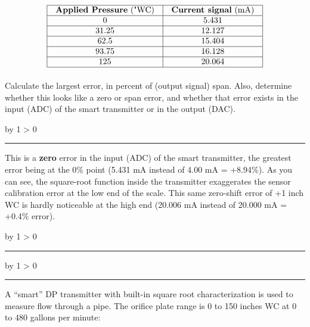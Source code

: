 \documentclass[12pt,a4paper]{article}
\def\oppgave{
            \advance\questnum by 1
            \ifnum \questnum > 0
                 \hrule
                 \vskip 3pt
                 \leftline{Oppgave \the\questnum}
                 \vskip 3pt \fi}
\def\svar{
           \advance\answnum by 1
           \ifnum \answnum > 0
                \hrule
                \vskip 3pt
                \leftline{Svar \the\answnum}
                \vskip 3pt \fi}
\def\notes{
           \advance\explnum by 1
           \ifnum \explnum > 0
                \hrule
                \vskip 3pt
                \leftline{Notes \the\explnum}
                \vskip 3pt \fi}
\begin{document}

$$\vbox{\offinterlineskip
\halign{\strut
\vrule \quad\hfil # \ \hfil & 
\vrule \quad\hfil # \ \hfil \vrule \cr
\noalign{\hrule}
%
{\bf Applied Pressure} ("WC) & {\bf Current signal} (mA) \cr
%
\noalign{\hrule}
%
0 & 5.431 \cr
%
\noalign{\hrule}
%
31.25 & 12.127 \cr
%
\noalign{\hrule}
%
62.5 & 15.404 \cr
%
\noalign{\hrule}
%
93.75 & 16.128 \cr
%
\noalign{\hrule}
%
125 & 20.064 \cr
%
\noalign{\hrule}
} %
}$$ %

Calculate the largest error, in percent of (output signal) span.  Also, determine whether this looks like a zero or span error, and whether that error exists in the input (ADC) of the smart transmitter or in the output (DAC).

\vskip 10pt \filbreak 





\svar{} 

This is a {\bf zero} error in the input (ADC) of the smart transmitter, the greatest error being at the 0\% point (5.431 mA instead of 4.00 mA = +8.94\%).  As you can see, the square-root function inside the transmitter exaggerates the sensor calibration error at the low end of the scale.  This same zero-shift error of +1 inch WC is hardly noticeable at the high end (20.006 mA instead of 20.000 mA = +0.4\% error).

\vskip 10pt \filbreak 





\notes{} 



\vfil \eject 


\oppgave{} 

A ``smart'' DP transmitter with built-in square root characterization is used to measure flow through a pipe.  The orifice plate range is 0 to 150 inches WC at 0 to 480 gallons per minute:
\end{document}
